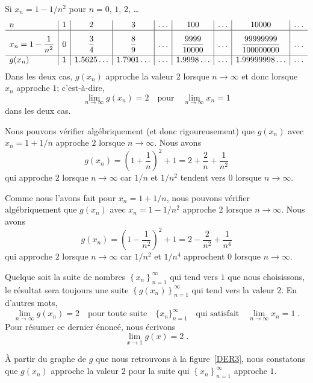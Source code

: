 {\begin{egg}
Si $x_n = 1 - 1/n^2$ pour $n=0$, $1$, $2$, \ldots
\[
\begin{array}{l|c|c|c|c|c|c|c|c}
n & 1 & 2 & 3 & \ldots & 100 & \ldots & 10000 & \ldots \\
\hline
\rule[-1em]{0ex}{3em} \displaystyle x_n = 1 - \frac{1}{n^2} &
\displaystyle 0 & \displaystyle \frac{3}{4} &
\displaystyle \frac{8}{9} & \ldots & \displaystyle \frac{9999}{10000} &
\ldots & \displaystyle \frac{99999999}{100000000} & \ldots \\
\hline
g(x_n) & 1 & 1.5625\ldots & 1.7901\ldots &
\ldots & 1.9998\ldots & \ldots & 1.99999998\ldots & \ldots
\end{array}
\]
Dans les deux cas, $g(x_n)$ approche la valeur $2$ lorsque
$n \to \infty$ et donc lorsque $x_n$ approche $1$; c'est-à-dire,  
\[
\lim_{n\rightarrow \infty} g(x_n) = 2
\quad \text{pour} \quad
\lim_{n\rightarrow \infty} x_n = 1
\]
dans les deux cas.

Nous pouvons vérifier algébriquement (et donc rigoureusement) que
$g(x_n)$ avec $x_n = 1 + 1/n$ approche $2$ lorsque $n \to \infty$.
Nous avons
\[
g(x_n) = \left(1+\frac{1}{n}\right)^2 + 1
= 2 + \frac{2}{n} + \frac{1}{n^2}
\]
qui approche $2$ lorsque $n \to \infty$ car $1/n$ et $1/n^2$ tendent
vers $0$ lorsque $n \to \infty$.

Comme nous l'avons fait pour $x_n = 1 + 1/n$, nous pouvons vérifier
algébriquement que $g(x_n)$ avec $x_n = 1 - 1/n^2$ approche $2$ lorsque
$n \to \infty$.  Nous avons
\[
g(x_n) = \left(1-\frac{1}{n^2}\right)^2 + 1
= 2 - \frac{2}{n^2} + \frac{1}{n^4}
\]
qui approche $2$ lorsque $n \to \infty$ car $1/n^2$
et $1/n^4$ approchent $0$ lorsque $n \to \infty$.

Quelque soit la suite de nombres
$\displaystyle \left\{x_n\right\}_{n=1}^\infty$
qui tend vers $1$ que nous choisissons, le résultat sera toujours une
suite $\displaystyle \left\{g(x_n)\right\}_{n=1}^\infty$ qui tend vers
la valeur $2$.  En d'autres mots,
\[
\lim_{n\rightarrow \infty} g(x_n) = 2 \quad
\text{pour toute suite} \quad \{x_n\}_{n=1}^\infty \quad
\text{qui satisfait} \quad
\lim_{n\rightarrow \infty} x_n = 1 \; .
\]
Pour résumer ce dernier énoncé, nous écrivons
\[
\lim_{x\rightarrow 1} g(x) = 2 \; .
\]

À partir du graphe de $g$ que nous retrouvons à la figure~\ref{DER3},
nous constatons que $g(x_n)$ approche la valeur $2$ pour la suite qui
$\displaystyle \left\{x_n\right\}_{n=1}^\infty$ approche $1$.
\label{egg_cont1}
\end{egg}

}
